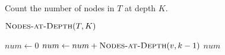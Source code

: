 
\begin{algorithm}[H]
  \caption{Count the number of nodes in $T$ at depth $K$.}
  \label{alg:nodes-at-depth-K}
  \begin{algorithmic}[1]
      \State \Return $\Call{Nodes-at-Depth}{T, K}$ 
    \EndProcedure

    \Statex
     
        \State {}
      \EndIf

      \hStatex
	\State {}
      \EndIf

      \hStatex
      \State $num \gets 0$
	\State $num \gets num + \Call{Nodes-at-Depth}{v, k - 1}$
      \EndFor
      \State \Return $num$
    \EndProcedure
  \end{algorithmic}
\end{algorithm}
